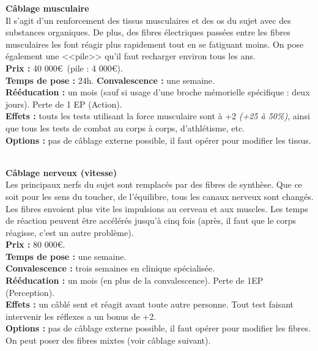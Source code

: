 \documentclass[11pt,twoside,a4paper]{article}
\begin{document}
\begin{multicols*}{2}
\textbf{C{\^a}blage musculaire}~\\
Il s'agit d'un renforcement des tissus musculaires et des os du sujet avec des substances organiques. De plus, des fibres {\'e}lectriques pass{\'e}es entre les fibres musculaires les font r{\'e}agir plus rapidement tout en se fatiguant moins. On pose {\'e}galement une <<pile>> qu'il faut recharger environ tous les ans. ~\\
{\small 
	\textbf{Prix : }40 000\euro ~(pile : 4 000\euro ). ~\\
	\textbf{Temps de pose : }24h. %
	\textbf{Convalescence : }une semaine. ~\\
	\textbf{R{\'e}{\'e}ducation : }un mois (sauf si usage d'une broche m{\'e}morielle sp{\'e}cifique : deux jours). Perte de 1 EP (Action). ~\\
	\textbf{Effets : }touts les tests utilisant la force musculaire sont {\`a} +2 \emph{(+25 {\`a} 50\%)}, ainsi que tous les tests de combat au corps {\`a} corps, d'athl{\'e}tisme, etc. ~\\
	\textbf{Options : }pas de c{\^a}blage externe possible, il faut op{\'e}rer pour modifier les tissus. ~\\
} %

\textbf{C{\^a}blage nerveux (vitesse)}~\\
Les principaux nerfs du sujet sont remplac{\'e}s par des fibres de synth{\`e}se. Que ce soit pour les sens du toucher, de l'{\'e}quilibre, tous les canaux nerveux sont chang{\'e}s. Les fibres envoient plus vite les impulsions au cerveau et aux muscles. Les temps de r{\'e}action peuvent {\^e}tre acc{\'e}l{\'e}r{\'e}s jusqu'{\`a} cinq fois (apr{\`e}s, il faut que le corps r{\'e}agisse, c'est un autre probl{\`e}me). ~\\
{\small 
	\textbf{Prix : }80 000\euro . ~\\
	\textbf{Temps de pose : }une semaine. ~\\
	\textbf{Convalescence : }trois semaines en clinique sp{\'e}cialis{\'e}e. ~\\
	\textbf{R{\'e}{\'e}ducation : }un mois (en plus de la convalescence). Perte de 1EP (Perception). ~\\
	\textbf{Effets : }un c{\^a}bl{\'e} sent et r{\'e}agit avant toute autre personne. Tout test faisant intervenir les r{\'e}flexes a un bonus de +2. ~\\
	\textbf{Options : }pas de c{\^a}blage externe possible, il faut op{\'e}rer pour modifier les fibres. On peut poser des fibres mixtes (voir c{\^a}blage suivant). ~\\
} %


\end{multicols*}
\end{document}
